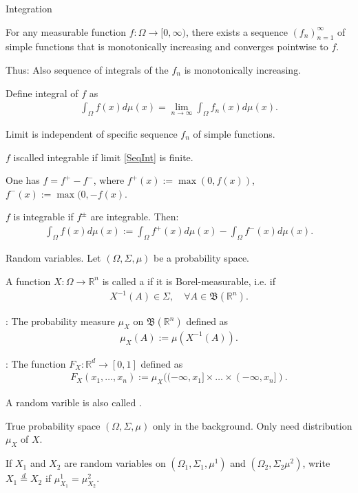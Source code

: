 \begin{frame}{Integration}

\bit
\item For any measurable function $f:\Omega\to[0,\infty)$, there exists a sequence $(f_n)_{n=1}^\infty$ of 
simple functions that is monotonically increasing and converges pointwise to $f$. 
\item Thus: Also sequence of integrals of the $f_n$ is monotonically increasing. 
\item[\iarrow] Define integral of $f$ as
\begin{align}\label{SeqInt}
\int_\Omega f(x)d\mu(x)=\lim_{n\to\infty}\int_{\Omega}f_n(x)d\mu(x). 
\end{align}
\item Limit is independent of specific sequence $f_n$ of simple functions. 
\item $f$ iscalled integrable if limit \eqref{SeqInt} is finite. 
\eit

\bit 
\item One has $f=f^{+}-f^{-}$, where  $f^+(x):=\max(0,f(x))$, $f^{-}(x):=\max(0,-f(x)$. 
\item $f$ is integrable if $f^{\pm}$ are integrable. Then:
\begin{align*}
\int_{\Omega}f(x)d\mu(x):=\int_{\Omega}f^{+}(x)d\mu(x)-\int_{\Omega}f^{-}(x)d\mu(x).
\end{align*}
\eit

\end{frame}

\begin{frame}{Random variables. }
Let $(\Omega,\Sigma,\mu)$ be a probability space. 
\bit
\item A function $X:\Omega\to\mathbb{R}^n$ is 
called a  if it is Borel-measurable, i.e. if 
\begin{align*}
X^{-1}(A)\in\Sigma, \quad \forall A\in\mathfrak{B}(\mathbb{R}^n). 
\end{align*}
\item {}: The probability measure $\mu_X$ on $\mathfrak{B}(\mathbb{R}^n)$ defined as 
\begin{align*}
\mu_X(A):=\mu(X^{-1}(A)).
\end{align*}
\item {}: The function $F_X:\mathbb{R}^d\to [0,1]$ defined as
\begin{align*}
F_X(x_1,\dots,x_n):=\mu_X((-\infty,x_1]\times\dots\times (-\infty,x_n]). 
\end{align*}   
\eit
{}
\bit
\item A random varible is also called . 
\item True probability space $(\Omega,\Sigma,\mu)$ only in the background. Only need distribution 
$\mu_X$ of $X$. 
\item [\iarrow] If $X_1$ and $X_2$ are random variables on $(\Omega_1,\Sigma_1,\mu^1)$ and $(\Omega_2,\Sigma_2\mu^2)$, 
write $X_1\stackrel{d}{=}X_2$ if $\mu^1_{X_1}=\mu^2_{X_2}$. 
\eit 
\end{frame}


